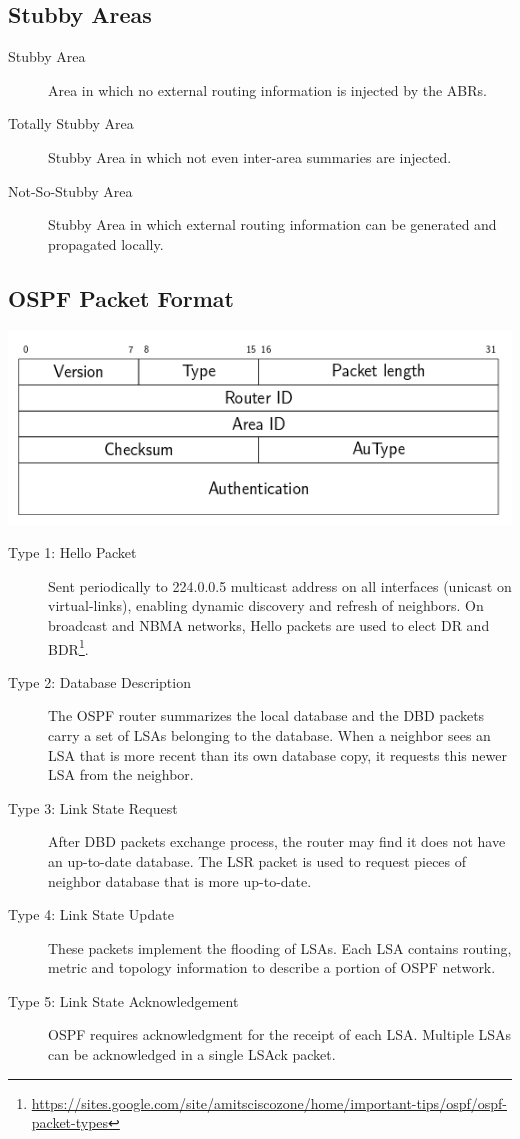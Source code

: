 \documentclass{article}
\begin{document}
\subsection{Stubby Areas}
	
\begin{description}
	\item[Stubby Area] Area in which no external routing information is injected by the ABRs.
	\item[Totally Stubby Area] Stubby Area in which not even inter-area summaries are injected.
	\item[Not-So-Stubby Area]  Stubby Area in which external routing information can be generated and propagated locally.
\end{description}



\subsection{OSPF Packet Format}
	

\centerline{\includegraphics[scale=0.5]{images/OSPFformat.png}\\[1cm]}

\begin{description}
	\item[Type 1: Hello Packet] Sent periodically to 224.0.0.5 multicast address on all interfaces (unicast on virtual-links), enabling dynamic discovery and refresh of neighbors. On broadcast and NBMA networks, Hello packets are used to elect DR and BDR\footnote{\url{https://sites.google.com/site/amitsciscozone/home/important-tips/ospf/ospf-packet-types}}.
	\item[Type 2: Database Description] The OSPF router summarizes the local database and the DBD packets carry a set of LSAs belonging to the database. When a neighbor sees an LSA that is more recent than its own database copy, it requests this newer LSA from the neighbor.
	\item[Type 3: Link State Request] After DBD packets exchange process, the router may find it does not have an up-to-date database. The LSR packet is used to request pieces of neighbor database that is more up-to-date. 
	\item[Type 4: Link State Update] These packets implement the flooding of LSAs. Each LSA contains routing, metric and topology information to describe a portion of OSPF network.
	\item[Type 5: Link State Acknowledgement] OSPF requires acknowledgment for the receipt of each LSA. Multiple LSAs can be acknowledged in a single LSAck packet.
\end{description}
\end{document}
